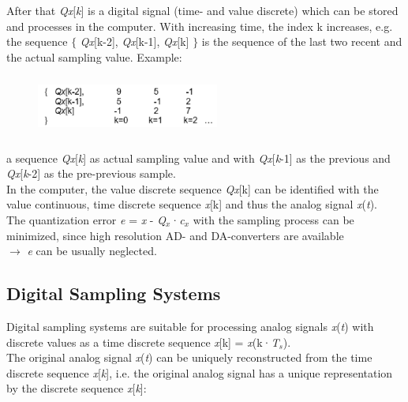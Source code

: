After that \textit{Qx}[\textit{k}] is a digital signal (time- and value discrete) which can be stored and processes in the computer. With increasing time, the index k increases, e.g. the sequence $\mathrm{\{}$ \textit{Qx}[k-2], \textit{Qx}[k-1], \textit{Qx}[k] $\mathrm{\}}$ is the sequence of the last two recent and the actual sampling value. Example:\\

    \begin{figure}[h]
    \centering
    \includegraphics[width=6cm, height=2cm]{Images/image183.png}
    \label{fig:Fig }
    \end{figure}

a sequence \textit{Qx}[\textit{k}] as actual sampling value and with \textit{Qx}[\textit{k}-1] as the previous and \textit{Qx}[\textit{k}-2] as the pre-previous sample.\\

In the computer, the value discrete sequence \textit{Qx}[k] can be identified with the value continuous, time discrete sequence \textit{x}[k] and thus the analog signal \textit{x}(\textit{t}). \\

The quantization error \textit{e} = \textit{x} - \textit{Q${}_{x}$}·\textit{c${}_{x}$} with the sampling process can be minimized, since high resolution AD- and DA-converters are available\\
$\rightarrow$  \textit{e} can be usually neglected.
\newpage
\subsection{Digital Sampling Systems}

Digital sampling systems are suitable for processing analog signals \textit{x}(\textit{t}) with discrete values as a time discrete sequence \textit{x}[k] = \textit{x}(k·\textit{T${}_{s}$}). \\

The original analog signal \textit{x}(\textit{t}) can be uniquely reconstructed from the time discrete sequence \textit{x}[\textit{k}], i.e. the original analog signal has a unique representation by the discrete sequence \textit{x}[\textit{k}]:\\

